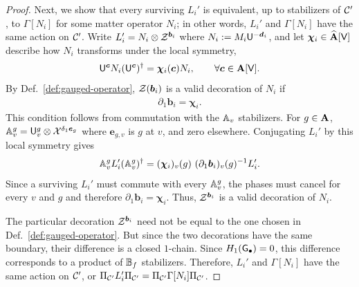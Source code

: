 \documentclass[11pt]{article}
\begin{document}
\begin{proof}
    Next, we show that every surviving $L_i'$ is equivalent, up to stabilizers of $\mathcal{C}'$, to $\Gamma[N_i]$ for some matter operator $N_i$; in other words, $L_i'$ and $\Gamma[N_i]$ have the same action on $\mathcal{C}'$.
    Write $L_i' = N_i \otimes \mathcal{Z}^{\bm b_i}$ where $N_i:= M_i\mathsf{U}^{-\bm d_i}$, and let $\bm{\chi}_i\in \widehat{\mathbf{A}}[\mathsf{V}]$ describe how $N_i$ transforms under the local symmetry, 
    \begin{align}
        \mathsf{U}^{\bm c}N_i (\mathsf{U}^{\bm c})^\dagger     = \bm{\chi}_i(\bm c) N_i,\qquad \forall \bm c\in \mathbf{A}[\mathsf{V}]\notag.
    \end{align}
    By Def.~\ref{def:gauged-operator}, $\mathcal{Z}(\bm b_i)$ is a valid decoration of $N_i$ if  
    \begin{align}
        \partial_1 \bm b_i = \bm{\chi}_i.
        \label{eq:decorated-requirement}
    \end{align}
    This condition follows from commutation with the $\mathbb{A}_v$ stabilizers. For $g\in \mathbf{A}$, $\mathbb{A}_v^g = \mathsf{U}^g_v\otimes \mathcal{X}^{\delta_1 \bm e_g}$ where $\bm e_{g,v}$ is $g$ at $v$, and zero elsewhere.
    Conjugating $L_i'$ by this local symmetry gives
    \begin{align}
        \mathbb{A}_v^gL_i'({\mathbb{A}_v^g})^\dagger = (\bm{\chi}_i)_v(g)\ (\partial_1\bm b_i)_v(g)^{-1}L_i'.
    \end{align}
    Since a surviving $L_i'$ must commute with every $\mathbb{A}_v^g$, the phases must cancel for every $v$ and $g$ and therefore $\partial_1\bm b_i = \bm{\chi}_i$.
    Thus, $\mathcal{Z}^{\bm b_i}$ is a valid decoration of $N_i$.

    The particular decoration $\mathcal{Z}^{\bm b_i}$ need not be equal to the one chosen in Def.~\ref{def:gauged-operator}.
    But since the two decorations have the same boundary, their difference is a closed $1$-chain.
    Since $H_1(\mathsf{G}_\bullet) = 0$, this difference corresponds to a product of $\mathbb{B}_f$ stabilizers.
    Therefore, $L_i'$ and $\Gamma[N_i]$ have the same action on $\mathcal{C}'$, or $\Pi_{\mathcal{C}'}L_i'\Pi_{\mathcal{C}'} = \Pi_{\mathcal{C}'}\Gamma[N_i]\Pi_{\mathcal{C}'}$.


\end{proof}
\end{document}
